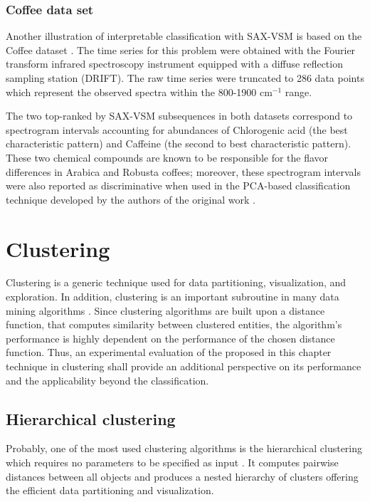 \subsubsection{Coffee data set}
Another illustration of interpretable classification with SAX-VSM is based on the Coffee dataset \cite{citeulike:12550833}.
The time series for this problem were obtained with the Fourier transform infrared spectroscopy instrument equipped 
with a diffuse reflection sampling station (DRIFT). The raw time series were truncated to 286 data points which represent 
the observed spectra within the 800-1900 cm$^{-1}$ range. 

The two top-ranked by SAX-VSM subsequences in both datasets correspond to spectrogram intervals accounting for
abundances of Chlorogenic acid (the best characteristic pattern) and Caffeine (the second to best characteristic pattern).
These two chemical compounds are known to be responsible for the flavor differences in Arabica and Robusta coffees; 
moreover, these spectrogram intervals were also reported as discriminative when used in the PCA-based classification 
technique developed by the authors of the original work \cite{citeulike:12550833}.

\section{Clustering}\label{saxvsm_clustering}
Clustering is a generic technique used for data partitioning, visualization, and exploration.
In addition, clustering is an important subroutine in many data mining algorithms \cite{citeulike:167581}.
Since clustering algorithms are built upon a distance function, that computes similarity between clustered entities,
the algorithm's performance is highly dependent on the performance of the chosen distance function. 
Thus, an experimental evaluation of the proposed in this chapter technique in clustering shall provide an additional 
perspective on its performance and the applicability beyond the classification.

\subsection{Hierarchical clustering}
Probably, one of the most used clustering algorithms is the hierarchical clustering which requires no
parameters to be specified as input \cite{citeulike:1576606}. It computes pairwise distances between all objects 
and produces a nested hierarchy of clusters offering the efficient data partitioning and visualization. 

